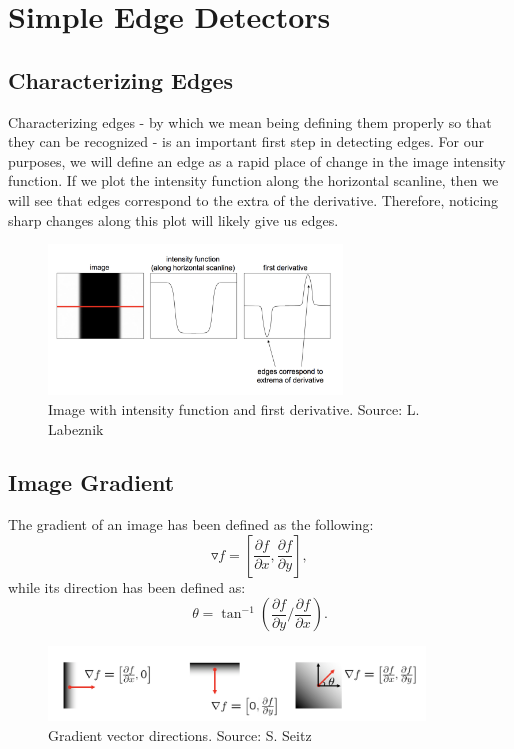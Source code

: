 \documentclass{article}
\begin{document}
\section{Simple Edge Detectors}

\subsection{Characterizing Edges}
Characterizing edges - by which we mean being defining them properly so that they can be recognized - is an important first step in detecting edges. For our purposes, we will define an edge as a rapid place of change in the image intensity function. If we plot the intensity function along the horizontal scanline, then we will see that edges correspond to the extra of the derivative. Therefore, noticing sharp changes along this plot will likely give us edges.

\begin{figure}[H]
\centering
\includegraphics[height=4cm]{lazebnik.png}
\caption{Image with intensity function and first derivative. Source: L. Labeznik}
\end{figure}

\subsection{Image Gradient}
The gradient of an image has been defined as the following:
$$\triangledown f = \left[ \frac{\partial f}{\partial x}, \frac{\partial f}{\partial y}\right],$$
while its direction has been defined as:
$$\theta = \tan^{-1} \left( \frac{\partial f}{\partial y} / \frac{\partial f}{\partial x} \right).$$

\begin{figure}[H]
\centering
\includegraphics[width=10cm]{seitz_gradient_direction.png}
\caption{Gradient vector directions. Source: S. Seitz}
\end{figure}
\end{document}
